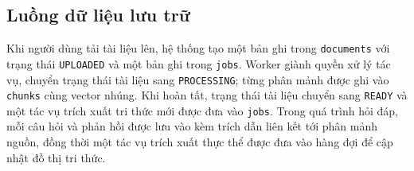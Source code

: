\subsection{Luồng dữ liệu lưu trữ}
Khi người dùng tải tài liệu lên, hệ thống tạo một bản ghi trong \texttt{documents} với trạng thái \texttt{UPLOADED} và một bản ghi trong \texttt{jobs}. Worker giành quyền xử lý tác vụ, chuyển trạng thái tài liệu sang \texttt{PROCESSING}; từng phân mảnh được ghi vào \texttt{chunks} cùng vector nhúng. Khi hoàn tất, trạng thái tài liệu chuyển sang \texttt{READY} và một tác vụ trích xuất tri thức mới được đưa vào \texttt{jobs}. Trong quá trình hỏi đáp, mỗi câu hỏi và phản hồi được lưu vào  kèm trích dẫn liên kết tới phân mảnh nguồn, đồng thời một tác vụ trích xuất thực thể được đưa vào hàng đợi để cập nhật đồ thị tri thức.
